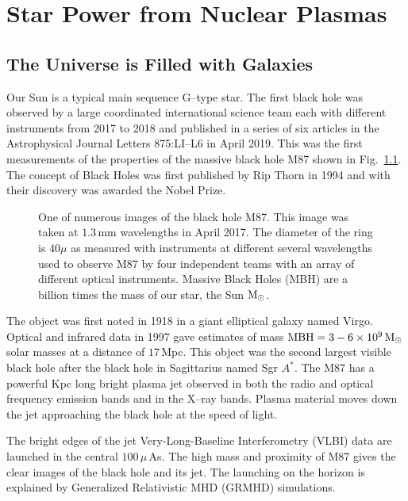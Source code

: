 \documentclass[a4paper,openany,12pt]{book}
\begin{document}
\chapter{Star Power from Nuclear Plasmas}

\section{The Universe is Filled with Galaxies}

Our Sun is a typical main sequence G--type star. The first black hole was observed by a large coordinated international science team each with different instruments from 2017 to 2018 and published in a series of six articles in the Astrophysical Journal Letters 875:LI--L6 in April 2019. This was the first measurements of the properties of the massive black hole M87 shown in Fig.~\ref{fig1-2ITER}. The concept of Black Holes was first published by Rip Thorn in 1994 and with their discovery was awarded the Nobel Prize.
%
\begin{figure}[H]
\centerline{}
\caption{One of numerous images of the black hole M87. This image was taken at $1.3\,$mm wavelengths in April 2017. The diameter of the ring is $40\mu$ as measured with instruments at different several wavelengths used to observe M87 by four independent teams with an array of different optical instruments. Massive Black Holes (MBH) are a billion times the mass of our star, the Sun $\rm M_\odot$.}
\label{fig1-2ITER}
\end{figure}
%

The object was first noted in 1918 in a giant elliptical galaxy named Virgo. Optical and infrared data in 1997 gave estimates of mass $\rm MBH=3-6\times 10^9\,\rm M_\odot$ solar masses at a distance of $17\,$Mpc. This object was the second largest visible black hole after the black hole in Sagittarius named Sgr $A^*$. The M87 has a powerful Kpc long bright plasma jet observed in both the radio and optical frequency emission bands and in the  X--ray bands. Plasma material moves down the jet approaching the black hole at the speed of light.

The bright edges of the jet Very-Long-Baseline Interferometry (VLBI) data are launched in the central $100\,\mu\,$As. The high mass and proximity of M87 gives the clear images of the black hole and its jet. The launching on the horizon is explained by Generalized Relativistic MHD (GRMHD) simulations.
\end{document}
